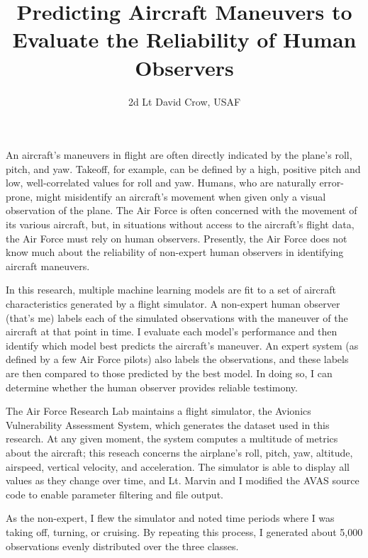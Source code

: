 \documentclass{article}
\title{Predicting Aircraft Maneuvers to Evaluate the Reliability of Human Observers}
\author{2d Lt David Crow, USAF}
\begin{document}
\maketitle
\frenchspacing


An aircraft's maneuvers in flight are often directly indicated by the plane's roll, pitch, and yaw. Takeoff, for example, can be defined by a high, positive pitch and low, well-correlated values for roll and yaw. Humans, who are naturally error-prone, might misidentify an aircraft's movement when given only a visual observation of the plane. The Air Force is often concerned with the movement of its various aircraft, but, in situations without access to the aircraft's flight data, the Air Force must rely on human observers. Presently, the Air Force does not know much about the reliability of non-expert human observers in identifying aircraft maneuvers.

In this research, multiple machine learning models are fit to a set of aircraft characteristics generated by a flight simulator. A non-expert human observer (that's me) labels each of the simulated observations with the maneuver of the aircraft at that point in time. I evaluate each model's performance and then identify which model best predicts the aircraft's maneuver. An expert system (as defined by a few Air Force pilots) also labels the observations, and these labels are then compared to those predicted by the best model. In doing so, I can determine whether the human observer provides reliable testimony.


The Air Force Research Lab maintains a flight simulator, the Avionics Vulnerability Assessment System, which generates the dataset used in this research. At any given moment, the system computes a multitude of metrics about the aircraft; this reseach concerns the airplane's roll, pitch, yaw, altitude, airspeed, vertical velocity, and acceleration. The simulator is able to display all values as they change over time, and Lt. Marvin and I modified the AVAS source code to enable parameter filtering and file output.

As the non-expert, I flew the simulator and noted time periods where I was taking off, turning, or cruising. By repeating this process, I generated about 5,000 observations evenly distributed over the three classes.
\end{document}
